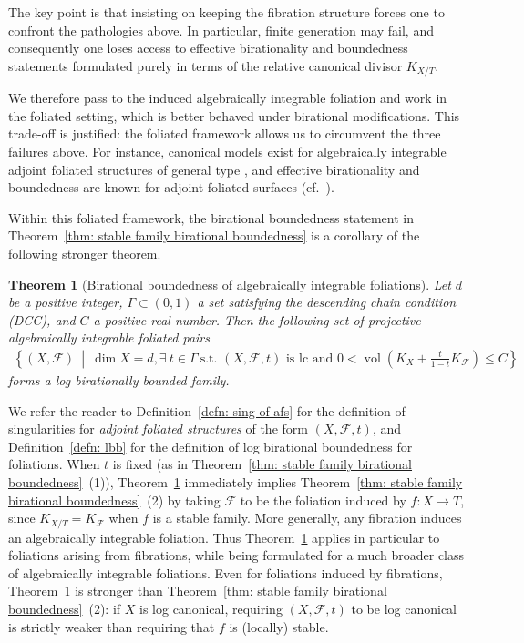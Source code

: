 \documentclass[11pt,reqno]{amsart}
\numberwithin{equation}{section}
\newcommand{\vol}{\operatorname{vol}}
\newcommand{\Ff}{\mathcal{F}}
\newcommand{\Ii}{\Gamma}
\newtheorem{alphthm}{Theorem}
\theoremstyle{definition}
\begin{document}
The key point is that insisting on keeping the fibration structure forces one to confront the pathologies above. In particular, finite generation may fail, and consequently one loses access to effective birationality and boundedness statements formulated purely in terms of the relative canonical divisor $K_{X/T}$.

We therefore pass to the induced algebraically integrable foliation and work in the foliated setting, which is better behaved under birational modifications. This trade-off is justified: the foliated framework allows us to circumvent the three failures above. For instance, canonical models exist for algebraically integrable adjoint foliated structures of general type \cite{Cas+25a}, and effective birationality and boundedness are known for adjoint foliated surfaces (cf.~\cite{SS23,SSV25}).

Within this foliated framework, the birational boundedness statement in Theorem~\ref{thm: stable family birational boundedness} is a corollary of the following stronger theorem.

\begin{alphthm}[Birational boundedness of algebraically integrable foliations]\label{thm: birationally bounded main}
Let $d$ be a positive integer, 
$\Ii\subset (0,1)$ 
a set satisfying the descending chain condition (DCC), and
$C$
a positive real number.
Then the following set of projective algebraically integrable foliated pairs
\begin{align*}
    \left \{
(X,\Ff)
\ \middle \vert \
\dim X=d, 
\exists\ t\in\Ii\
\text{s.t. $(X,\Ff,t)$ is lc and } %
0<\vol\!\left(K_X+\frac{t}{1-t}K_{\Ff}\right)\le C
   \right \}
\end{align*}
forms a log birationally bounded family.
\end{alphthm}

We refer the reader to 
Definition~\ref{defn: sing of afs} 
for the definition of singularities for \emph{adjoint foliated structures} of the form $(X,\Ff,t)$, 
and 
Definition~\ref{defn: lbb} for the definition of log birational boundedness for foliations. 
When $t$ is fixed (as in Theorem~\ref{thm: stable family birational boundedness}~(1)), Theorem~\ref{thm: birationally bounded main} immediately implies Theorem~\ref{thm: stable family birational boundedness}~(2) by taking $\Ff$ to be the foliation induced by $f\colon X\to T$, since $K_{X/T}=K_{\Ff}$ when $f$ is a stable family. More generally, any fibration induces an algebraically integrable foliation. Thus Theorem~\ref{thm: birationally bounded main} applies in particular to foliations arising from fibrations, while being formulated for a much broader class of algebraically integrable foliations. Even for foliations induced by fibrations, Theorem~\ref{thm: birationally bounded main} is stronger than Theorem~\ref{thm: stable family birational boundedness}~(2): if $X$ is log canonical, requiring $(X,\Ff,t)$ to be log canonical is strictly weaker than requiring that $f$ is (locally) stable.
\end{document}
